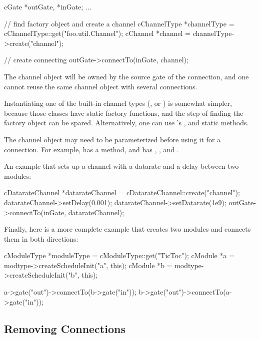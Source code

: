 \begin{cpp}
cGate *outGate, *inGate;
...

// find factory object and create a channel
cChannelType *channelType = cChannelType::get("foo.util.Channel");
cChannel *channel = channelType->create("channel");

// create connecting
outGate->connectTo(inGate, channel);
\end{cpp}

The channel object will be owned by the source gate of the connection, and
one cannot reuse the same channel object with several connections.

Instantiating one of the built-in channel types (,
 or ) is somewhat simpler,
because those classes have static  factory functions, and the
step of finding the factory object can be spared. Alternatively, one can use
's , 
and  static methods.

The channel object may need to be parameterized before using it for a
connection. For example,  has a 
method, and  has ,
,  and
.

An example that sets up a channel with a datarate and a delay between two
modules:

\begin{cpp}
cDatarateChannel *datarateChannel = cDatarateChannel::create("channel");
datarateChannel->setDelay(0.001);
datarateChannel->setDatarate(1e9);
outGate->connectTo(inGate, datarateChannel);
\end{cpp}

Finally, here is a more complete example that creates two modules and
connects them in both directions:

\begin{cpp}
cModuleType *moduleType = cModuleType::get("TicToc");
cModule *a = modtype->createScheduleInit("a", this);
cModule *b = modtype->createScheduleInit("b", this);

a->gate("out")->connectTo(b->gate("in"));
b->gate("out")->connectTo(a->gate("in"));
\end{cpp}


\subsection{Removing Connections}
\label{sec:simple-modules:removing-connections}

